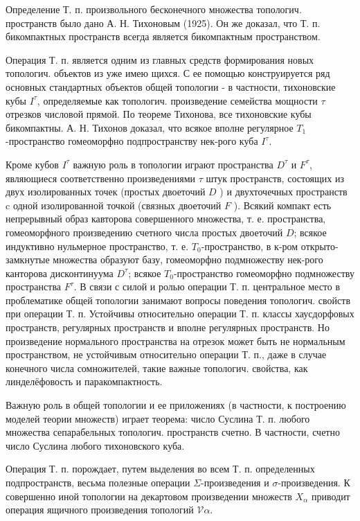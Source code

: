 \documentclass[10pt]{article}
\begin{document}
Определение Т. п. произвольного бесконечного множества топологич. пространств было дано А. Н. Тихоновым (1925). Он же доказал, что Т. п. бикомпактных пространств всегда является бикомпактным пространством.



Операция Т. п. является одним из главных средств формирования новых топологич. объектов из уже имею щихся. С ее помощью конструируется ряд основных стандартных объектов общей топологии - в частности, тихоновские кубы $I^{\tau}$, определяемые как топологич. произведение семейства мощности $\tau$ отрезков числовой прямой. По теореме Тихонова, все тихоновские кубы бикомпактны. А. Н. Тихонов доказал, что всякое вполне регулярное $T_{1}$-пространство гомеоморфно подпространству нек-рого куба $I^{\tau}$.



Кроме кубов $I^{\tau}$ важную роль в топологии играют пространства $D^{\tau}$ и $F^{\tau}$, являющиеся соответственно произведениями $\tau$ штук пространств, состоящих из двух изолированных точек (простых двоеточий $D$ ) и двухточечных пространств $\mathrm{c}$ одной изолированной точкой (связных двоеточий $F$ ). Всякий компакт есть непрерывный образ кавторова совершенного множества, т. е. пространства, гомеоморфного произведению счетного числа простых двоеточий $D$; всякое индуктивно нульмерное пространство, т. е. $T_{0}$-пространство, в к-ром открыто-замкнутые множества образуют базу, гомеоморфно подмножеству нек-рого канторова дисконтинуума $D^{\tau}$; всякое $T_{0}$-пространство гомеоморфно подмножеству пространства $F^{\tau}$. В связи с силой и ролью операции Т. п. центральное место в проблематике общей топологии занимают вопросы поведения топологич. свойств при операции Т. п. Устойчивы относительно операции Т. п. классы хаусдорфовых пространств, регулярных пространств и вполне регулярных пространств. Но произведение нормального пространства на отрезок может быть не нормальным пространством, не устойчивым относительно операции Т. п., даже в случае конечного числа сомножителей, такие важные топологич. свойства, как линделёфовость и паракомпактность.



Важную роль в общей топологии и ее приложениях (в частности, к построению моделей теории множеств) играет теорема: число Суслина Т. п. любого множества сепарабельных топологич. пространств счетно. В частности, счетно число Суслина любого тихоновского куба.



Операция Т. п. порождает, путем выделения во всем Т. п. определенных подпространств, весьма полезные операции $\Sigma$-произведения и $\sigma$-произведения. К совершенно иной топологии на декартовом произведении множеств $X_{\alpha}$ приводит операция ящичного произведения топологий $\mathscr{V} \alpha$.
\end{document}
